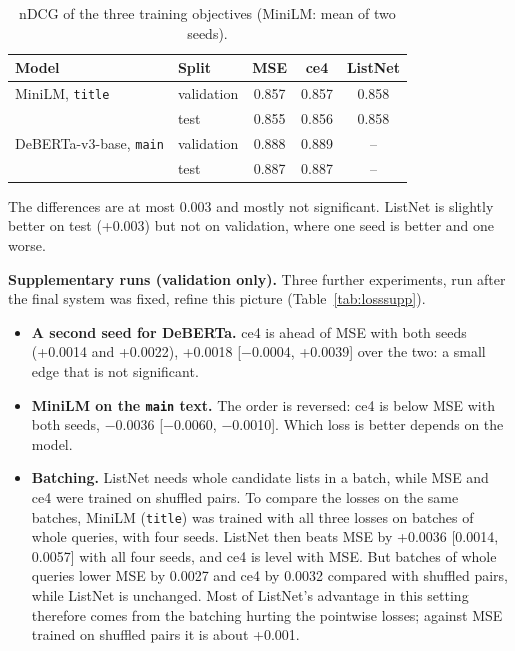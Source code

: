 \documentclass[12pt,a4paper]{report}
\begin{document}
\begin{table}[H]
\centering
\caption{nDCG of the three training objectives (MiniLM: mean of two seeds).}
\label{tab:d2}
\small
\begin{tabular}{@{}llccc@{}}
\toprule
\textbf{Model} & \textbf{Split} & \textbf{MSE} & \textbf{ce4} & \textbf{ListNet} \\
\midrule
MiniLM, \texttt{title} & validation & 0.857 & 0.857 & 0.858 \\
 & test & 0.855 & 0.856 & 0.858 \\
DeBERTa-v3-base, \texttt{main} & validation & 0.888 & 0.889 & -- \\
 & test & 0.887 & 0.887 & -- \\
\bottomrule
\end{tabular}
\end{table}

The differences are at most 0.003 and mostly not significant. ListNet is slightly better on test (+0.003) but not on validation, where one seed is better and one worse.

\textbf{Supplementary runs (validation only).} Three further experiments, run after the final system was fixed, refine this picture (Table~\ref{tab:losssupp}).
\begin{itemize}
  \item \textbf{A second seed for DeBERTa.} ce4 is ahead of MSE with both seeds (+0.0014 and +0.0022), +0.0018 [$-$0.0004, +0.0039] over the two: a small edge that is not significant.
  \item \textbf{MiniLM on the \texttt{main} text.} The order is reversed: ce4 is below MSE with both seeds, $-$0.0036 [$-$0.0060, $-$0.0010]. Which loss is better depends on the model.
  \item \textbf{Batching.} ListNet needs whole candidate lists in a batch, while MSE and ce4 were trained on shuffled pairs. To compare the losses on the same batches, MiniLM (\texttt{title}) was trained with all three losses on batches of whole queries, with four seeds. ListNet then beats MSE by +0.0036 [0.0014, 0.0057] with all four seeds, and ce4 is level with MSE. But batches of whole queries lower MSE by 0.0027 and ce4 by 0.0032 compared with shuffled pairs, while ListNet is unchanged. Most of ListNet's advantage in this setting therefore comes from the batching hurting the pointwise losses; against MSE trained on shuffled pairs it is about +0.001.
\end{itemize}
\end{document}
